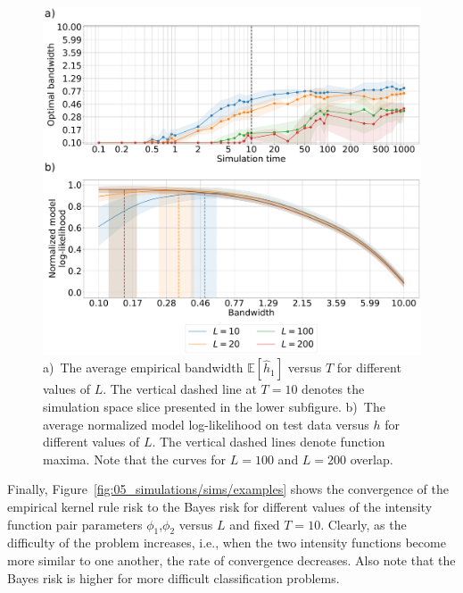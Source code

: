 \documentclass[lettersize,journal,onecolumn]{IEEEtran}
\theoremstyle{definition}
\newcommand{\figurewidth}{0.5\columnwidth}  %
\renewcommand{\figurename}{Figure}
\newcommand{\E}[1]{\mathbb{E}\left[#1\right]}
\begin{document}
\begin{figure}[!t]
	\includegraphics[width=\figurewidth]{pawla4}
	\centering
	\caption{
		a)~The average empirical bandwidth $\E{\widehat{h}_{1}}$ versus $T$ for different 
		values of $L$. The vertical dashed 
		line at $T=10$ denotes the simulation space slice presented in the lower 
		subfigure.
		b)~The average normalized model log-likelihood on test data versus $h$ for 
		different values of $L$. The vertical dashed lines denote function maxima. Note 
		that the curves for $L=100$ and $L=200$ overlap.
	}
	\label{fig:05_simulations/sims/bandwidth}
\end{figure}

Finally, \figurename~\ref{fig:05_simulations/sims/examples} shows the convergence of the 
empirical kernel rule risk to the Bayes risk for different values of the intensity 
function pair parameters $\phi_{1}$,\enspace $\phi_{2}$ versus $L$ and fixed $T=10$. 
Clearly, as the difficulty of the problem increases, i.e., when the two intensity
functions become more similar to one another, the rate of convergence decreases.
Also note that the Bayes risk is higher for more difficult
classification problems.
\end{document}
